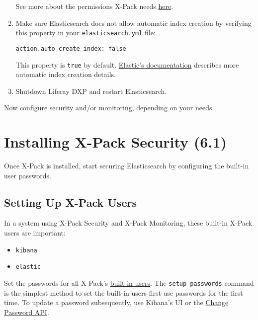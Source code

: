 \begin{enumerate}
  See more about the permissions X-Pack needs
  \href{https://www.elastic.co/guide/en/elasticsearch/reference/6.1/installing-xpack-es.html}{here}.
\item
  Make sure Elasticsearch does not allow automatic index creation by
  verifying this property in your \texttt{elasticsearch.yml} file:

\begin{verbatim}
action.auto_create_index: false
\end{verbatim}

  This property is \texttt{true} by default.
  \href{https://www.elastic.co/guide/en/elasticsearch/reference/6.1/docs-index_.html\#index-creation}{Elastic's
  documentation} describes more automatic index creation details.
\item
  Shutdown Liferay DXP and restart Elasticsearch.
\end{enumerate}

Now configure security and/or monitoring, depending on your needs.

\section{Installing X-Pack Security
(6.1)}\label{installing-x-pack-security-6.1}

Once X-Pack is installed, start securing Elasticsearch by configuring
the built-in user passwords.

\subsection{Setting Up X-Pack Users}\label{setting-up-x-pack-users}

In a system using X-Pack Security and X-Pack Monitoring, these built-in
X-Pack users are important:

\begin{itemize}
\tightlist
\item
  \texttt{kibana}
\item
  \texttt{elastic}
\end{itemize}

Set the passwords for all X-Pack's
\href{https://www.elastic.co/guide/en/x-pack/6.1/setting-up-authentication.html\#built-in-users}{built-in
users}. The \texttt{setup-passwords} command is the simplest method to
set the built-in users first-use passwords for the first time. To update
a password subsequently, use Kibana's UI or the
\href{https://www.elastic.co/guide/en/elasticsearch/reference/6.1/security-api-change-password.html}{Change
Password API}.

